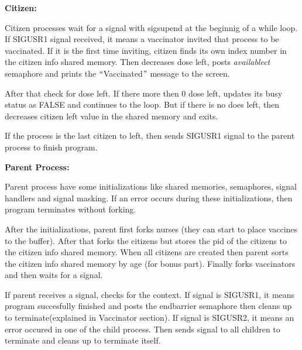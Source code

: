 \documentclass[12pt]{report}
\renewcommand{\_}{\kern-1.5pt\textunderscore\kern-1.5pt}
\begin{document}
\vspace{\baselineskip}
\begin{FlushLeft}
{\fontsize{14pt}{16.8pt}\selectfont \textbf{Citizen:}} 
\end{FlushLeft}
\begin{FlushLeft}
Citizen processes wait for a signal with sigsupend at the beginnig of a while loop. If SIGUSR1 signal received, it means a vaccinator invited that process to be vaccinated. If it is the first time inviting, citizen finds its own index number in the citizen info shared memory. Then decreases dose left, posts \textit{available\_ct }semaphore and prints the $``$Vaccinated$"$  message to the screen. 
\end{FlushLeft}
\begin{FlushLeft}
After that check for dose left. If there more then 0 dose left, updates its busy status as FALSE and continues to the loop. But if there is no does left, then decreases citizen left value in the shared memory and exits.
\end{FlushLeft}
\begin{FlushLeft}
If the process is the last citizen to left, then sends SIGUSR1 signal to the parent process to finish program.
\end{FlushLeft}

\vspace{\baselineskip}
\begin{FlushLeft}
{\fontsize{14pt}{16.8pt}\selectfont \textbf{Parent Process:}} 
\end{FlushLeft}
\begin{FlushLeft}
Parent process have some initializations like shared memories, semaphores, signal handlers and signal masking. If an error occurs during these initializations, then program terminates without forking.
\end{FlushLeft}
\begin{FlushLeft}
After the initializations, parent first forks nurses (they can start to place vaccines to the buffer). After that forks the citizens but stores the pid of the citizens to the citizen info shared memory. When all citizens are created then parent sorts the citizen info shared memory by age (for bonus part). Finally forks vaccinators and then waits for a signal.
\end{FlushLeft}
\begin{FlushLeft}
If parent receives a signal, checks for the context. If signal is SIGUSR1, it means program succesfully finished and posts the end\_barrier semaphore then cleans up to terminate(explained in Vaccinator section). If signal is SIGUSR2, it means an error occured in one of the child process. Then sends signal to all children to terminate and cleans up to terminate itself.
\end{FlushLeft}
\end{document}
